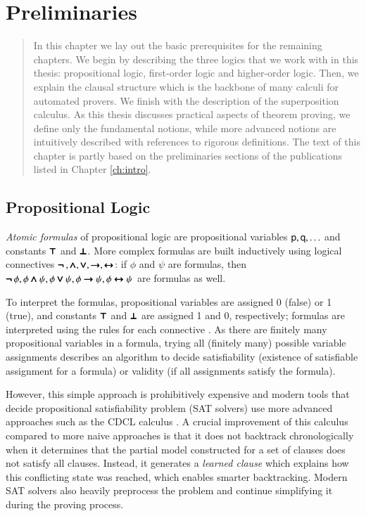\chapter{Preliminaries}
\label{ch:pre}

\begin{abstract}
    In this chapter we lay out the basic prerequisites for the remaining
    chapters. We begin by describing the three logics that we work with in this
    thesis: propositional logic, first-order logic and higher-order logic. Then,
    we explain the clausal structure which is the backbone of many calculi for
    automated provers. We finish with the description of the superposition
    calculus. As this thesis discusses practical aspects of theorem proving, we
    define only the fundamental notions, while more advanced notions are
    intuitively described with references to rigorous definitions. The text of
    this chapter is partly based on the preliminaries sections of the
    publications listed in Chapter \ref{ch:intro}.
\end{abstract}
      
\newpage


\section{Propositional Logic}

\emph{Atomic formulas} of propositional logic are propositional variables
$\mathsf{p}, \mathsf{q}, \ldots$ and constants $\pmb{\top}$ and $\pmb{\bot}$. More complex
formulas are built inductively using logical connectives $\pmb{\neg\,}, \pmb{\land}, \pmb{\lor},
\pmb{\rightarrow}, \allowbreak \pmb{\leftrightarrow}$: if $\phi$ and $\psi$ are formulas, then $\pmb{\neg\,} \phi, \phi \pmb{\land}
\psi, \allowbreak \phi \pmb{\lor} \psi, \phi \pmb{\rightarrow} \psi, \phi \pmb{\leftrightarrow} \psi$ are formulas as well.

To interpret the formulas, propositional variables are assigned 0 (false) or 1
(true), and constants $\pmb{\top}$ and $\pmb{\bot}$ are assigned 1 and 0, respectively; formulas are interpreted using the rules for each connective
\cite[Sect.~1.4]{hr-00-logic-in-cs}. As there are finitely many propositional
variables in a formula, trying all (finitely many) possible variable assignments
describes an algorithm to decide satisfiability (existence of satisfiable
assignment for a formula) or validity (if all assignments satisfy the formula).

However, this simple approach is prohibitively expensive and modern tools that
decide propositional satisfiability problem (SAT solvers) use more advanced
approaches such as the CDCL calculus \cite{mss-96-cdcl}. A crucial improvement of
this calculus compared to more naive approaches is that it does not backtrack
chronologically when it determines that the partial model constructed for a set
of clauses does not satisfy all clauses. Instead, it generates a \emph{learned
clause} which explains how this conflicting state was reached, which enables
smarter backtracking.   Modern SAT solvers also heavily preprocess the problem
and continue simplifying it during the proving process.


